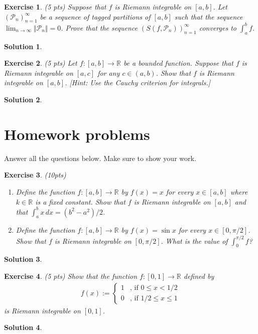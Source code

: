 \documentclass[12pt]{article}
\newcommand{\bR}{\mathbb{R}}
\newcommand{\cP}{\mathcal{P}}
\newcommand{\ra}{\rightarrow}
\theoremstyle{plain}
\newtheorem{exer}{\textbf{Exercise}}}
\theoremstyle{plain}
\newtheorem*{sol}{\textbf{Solution}}}
\begin{document}
\begin{exer}
(5 pts)
Suppose that $f$ is Riemann integrable on $[a, b]$. Let $( \cP_n )_{n =1}^\infty$ be a sequence of tagged partitions of $[a, b]$ such that the sequence $\lim_{n \ra \infty} \Vert \cP_n \Vert = 0$. Prove that the sequence $( S (f , \cP_n ))_{n = 1}^\infty$ converges to $\int_a^b f$.
\end{exer}
\begin{sol}

\end{sol}


\begin{exer}
(5 pts)
Let $f : [a, b] \ra \bR$ be a bounded function. Suppose that $f$ is Riemann integrable on $[a, c]$ for any $c \in (a, b)$. Show that $f$ is Riemann integrable on $[a, b]$. [Hint: Use the Cauchy criterion for integrals.]
\end{exer}
\begin{sol}

\end{sol}

\section{Homework problems}
Answer all the questions below. Make sure to show your work.


\begin{exer}
(10pts)
\begin{enumerate}[label=\textbf{\alph*)}]
\item Define the function $f : [a, b] \ra \bR$ by $f(x) = x$ for every $x \in [a, b]$ where $k \in \bR$ is a fixed constant. Show that $f$ is Riemann integrable on $[a, b]$ and that $\int_a^b x \, dx = (b^2 - a^2)/2$.
\item Define the function $f : [a, b] \ra \bR$ by $f(x) = \sin x$ for every $x \in [0, \pi/2]$. Show that $f$ is Riemann integrable on $[0, \pi/2 ]$. What is the value of $\int_0^{\pi/2} f$?
\end{enumerate}
\end{exer}
\begin{sol}

\end{sol}

\begin{exer}
(5 pts)
Show that the function $f : [0, 1] \ra \bR$ defined by
	\begin{align*}
	f(x) := \begin{cases}
	1 & \text{, if } 0 \leq x < 1/2 \\
	0 & \text{, if } 1/2 \leq x \leq 1 
	\end{cases}
	\end{align*}
is Riemann integrable on $[0, 1]$.
\end{exer}
\begin{sol}

\end{sol}
\end{document}
